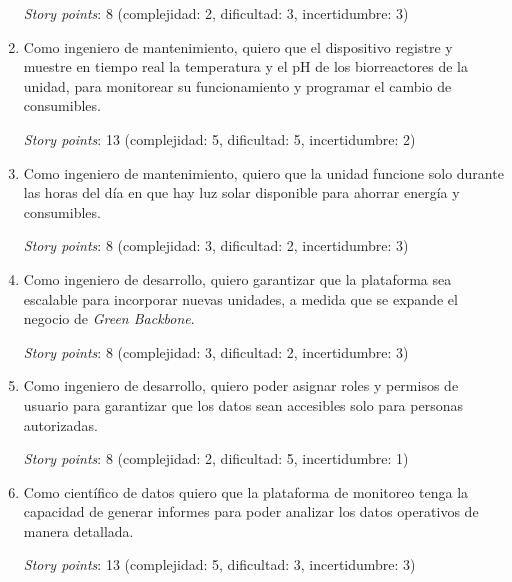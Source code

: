 \documentclass[
11pt, %
]{charter}
\begin{document}
\begin{enumerate}
\textit{Story points}: 8 (complejidad: 2, dificultad: 3, incertidumbre: 3)

\item Como ingeniero de mantenimiento, quiero que el dispositivo registre y muestre en tiempo real la temperatura y el pH de los biorreactores de la unidad, para monitorear su funcionamiento y programar el cambio de consumibles.

\textit{Story points}: 13 (complejidad: 5, dificultad: 5, incertidumbre: 2)

\item Como ingeniero de mantenimiento, quiero que la unidad funcione solo durante las horas del día en que hay luz solar disponible para ahorrar energía y consumibles.

\textit{Story points}: 8 (complejidad: 3, dificultad: 2, incertidumbre: 3)

\item Como ingeniero de desarrollo, quiero garantizar que la plataforma sea escalable para incorporar nuevas unidades, a medida que se expande el negocio de \textit{Green Backbone}. 

\textit{Story points}: 8 (complejidad: 3, dificultad: 2, incertidumbre: 3)

\item Como ingeniero de desarrollo, quiero poder asignar roles y permisos de usuario para garantizar que los datos sean accesibles solo para personas autorizadas. 

\textit{Story points}: 8 (complejidad: 2, dificultad: 5, incertidumbre: 1)

\item Como científico de datos quiero que la plataforma de monitoreo tenga la capacidad de generar informes para poder analizar los datos operativos de manera detallada. 

\textit{Story points}: 13 (complejidad: 5, dificultad: 3, incertidumbre: 3)
\end{enumerate}
\end{document}
